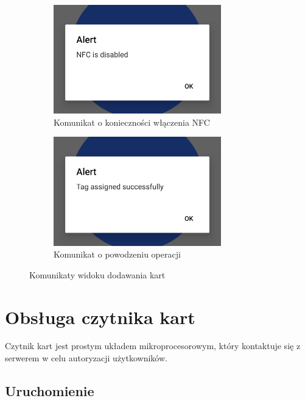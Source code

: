 \begin{figure}[H]
    \centering
    \begin{subfigure}[b]{0.49\textwidth}
        \centering
        \includegraphics[width=0.8\textwidth, frame]{graf/mobile/nfcDisabled.jpg}
        \caption{Komunikat o konieczności włączenia NFC}
        \label{fig:cardNFC}
    \end{subfigure}
    \begin{subfigure}[b]{0.49\textwidth}
        \centering
        \includegraphics[width=0.8\textwidth, frame]{graf/mobile/success.jpg}
        \caption{Komunikat o powodzeniu operacji}
        \label{fig:cardSuccess}
    \end{subfigure}
    \caption{Komunikaty widoku dodawania kart}
\end{figure}

\section{Obsługa czytnika kart}

Czytnik kart jest prostym układem mikroprocesorowym, który kontaktuje się z serwerem w celu autoryzacji użytkowników.

\subsection{Uruchomienie}

